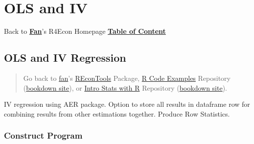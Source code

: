 \documentclass[
]{book}
\begin{document}
\hypertarget{ols-and-iv}{%
\section{OLS and IV}\label{ols-and-iv}}

Back to \textbf{\href{https://fanwangecon.github.io/}{Fan}}'s R4Econ Homepage \textbf{\href{https://fanwangecon.github.io/R4Econ/}{Table of Content}}

\hypertarget{ols-and-iv-regression}{%
\subsection{OLS and IV Regression}\label{ols-and-iv-regression}}

\begin{quote}
Go back to \href{http://fanwangecon.github.io/}{fan}'s \href{https://fanwangecon.github.io/REconTools/}{REconTools} Package, \href{https://fanwangecon.github.io/R4Econ/}{R Code Examples} Repository (\href{https://fanwangecon.github.io/R4Econ/bookdown}{bookdown site}), or \href{https://fanwangecon.github.io/Stat4Econ/}{Intro Stats with R} Repository (\href{https://fanwangecon.github.io/Stat4Econ/bookdown}{bookdown site}).
\end{quote}

IV regression using AER package. Option to store all results in dataframe row for combining results from other estimations together. Produce Row Statistics.

\hypertarget{construct-program}{%
\subsubsection{Construct Program}\label{construct-program}}
\end{document}
